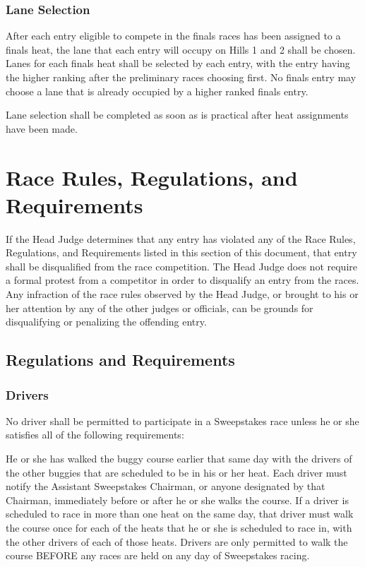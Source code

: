 \subsubsection{Lane Selection}

	After each entry eligible to compete in the finals races has been assigned to a
	finals heat, the lane that each entry will occupy on Hills 1 and 2 shall be
	chosen. Lanes for each finals heat shall be selected by each entry, with the
	entry having the higher ranking after the preliminary races choosing first. No
	finals entry may choose a lane that is already occupied by a higher ranked
	finals entry.

	Lane selection shall be completed as soon as is practical after heat
	assignments have been made.

\section{Race Rules, Regulations, and Requirements}

	If the Head Judge determines that any entry has violated any of the Race Rules,
	Regulations, and Requirements listed in this section of this document, that
	entry shall be disqualified from the race competition. The Head Judge does not
	require a formal protest from a competitor in order to disqualify an entry from
	the races. Any infraction of the race rules observed by the Head Judge, or
	brought to his or her attention by any of the other judges or officials, can be
	grounds for disqualifying or penalizing the offending entry.

\subsection{Regulations and Requirements}

\subsubsection{Drivers}

	No driver shall be permitted to participate in a Sweepstakes race unless he or
	she satisfies all of the following requirements:
	\newline

	He or she has walked the buggy course earlier that same day with the drivers of
	the other buggies that are scheduled to be in his or her heat. Each driver must
	notify the Assistant Sweepstakes Chairman, or anyone designated by that
	Chairman, immediately before or after he or she walks the course. If a driver
	is scheduled to race in more than one heat on the same day, that driver must
	walk the course once for each of the heats that he or she is scheduled to race
	in, with the other drivers of each of those heats. Drivers are only permitted
	to walk the course BEFORE any races are held on any day of Sweepstakes racing.

